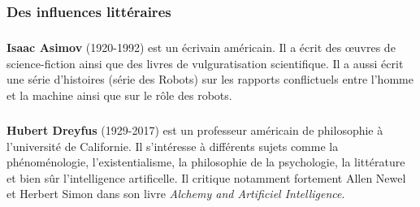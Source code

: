 \subsubsection{Des influences littéraires}

\subparagraph{}
\textbf{Isaac Asimov} (1920-1992) est un écrivain américain. Il a écrit des œuvres de science-fiction ainsi que des livres de vulguratisation scientifique. Il a aussi écrit une série d'histoires (série des Robots) sur les rapports conflictuels entre l'homme et la machine ainsi que sur le rôle des robots. 

\subparagraph{}
\textbf{Hubert Dreyfus} (1929-2017) est un professeur américain de philosophie à l'université de Californie. Il s'intéresse à différents sujets comme la phénoménologie, l'existentialisme, la philosophie de la psychologie, la littérature et bien sûr l'intelligence artificelle. Il critique notamment fortement Allen Newel et Herbert Simon dans son livre \textit{Alchemy and Artificiel Intelligence}.

 



